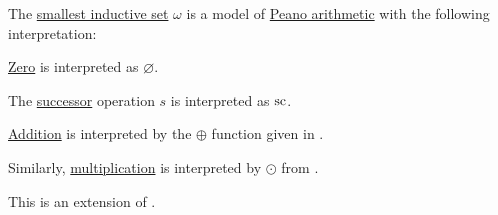 \begin{theorem}\label{thm:omega_is_model_of_pa}
  The \hyperref[thm:smallest_inductive_set_existence]{smallest inductive set} \( \omega \) is a model of \hyperref[def:peano_arithmetic]{Peano arithmetic} with the following interpretation:
  \begin{thmenum}
     \hyperref[def:peano_arithmetic/zero]{Zero} is interpreted as \( \varnothing \).

     The \hyperref[def:peano_arithmetic/succ]{successor} operation \( s \) is interpreted as \( \op{sc} \).

     \hyperref[def:peano_arithmetic/plus]{Addition} is interpreted by the \( \oplus \) function given in .

     Similarly, \hyperref[def:peano_arithmetic/mult]{multiplication} is interpreted by \( \odot \) from .
  \end{thmenum}
\end{theorem}
\begin{comments}
  \item This is an extension of .
\end{comments}

